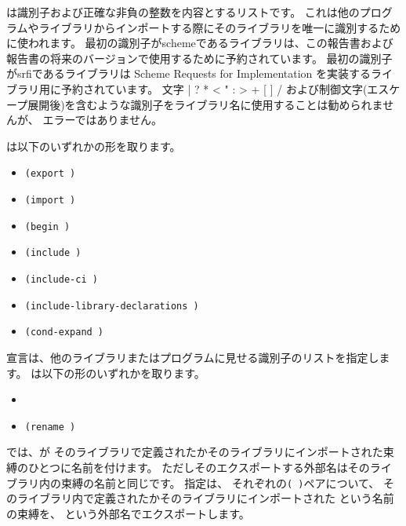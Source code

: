 は識別子および正確な非負の整数を内容とするリストです。
これは他のプログラムやライブラリからインポートする際にそのライブラリを唯一に識別するために使われます。
最初の識別子が{\cf scheme}であるライブラリは、この報告書および報告書の将来のバージョンで使用するために予約されています。
最初の識別子が{\cf srfi}であるライブラリは Scheme Requests for Implementation を実装するライブラリ用に予約されています。
文字 {\cf | \backwhack{} ? * < " : > + [ ] /}
および制御文字(エスケープ展開後)を含むような識別子をライブラリ名に使用することは勧められませんが、
エラーではありません。

\label{librarydeclarations}
は以下のいずれかの形を取ります。

\begin{itemize}

\item{\tt(export  \dotsfoo)}

\item{\tt(import  \dotsfoo)}

\item{\tt(begin  \dotsfoo)}

\item{\tt(include   \dotsfoo)}

\item{\tt(include-ci   \dotsfoo)}

\item{\tt(include-library-declarations   \dotsfoo)}

\item{\tt(cond-expand   \dotsfoo)}

\end{itemize}

宣言は、他のライブラリまたはプログラムに見せる識別子のリストを指定します。
は以下の形のいずれかを取ります。

\begin{itemize}
\item{}
\item{\tt{(rename  )}}
\end{itemize}

では、が
そのライブラリで定義されたかそのライブラリにインポートされた束縛のひとつに名前を付けます。
ただしそのエクスポートする外部名はそのライブラリ内の束縛の名前と同じです。
指定は、
それぞれの{\tt( )}ペアについて、
そのライブラリ内で定義されたかそのライブラリにインポートされた
という名前の束縛を、
という外部名でエクスポートします。

